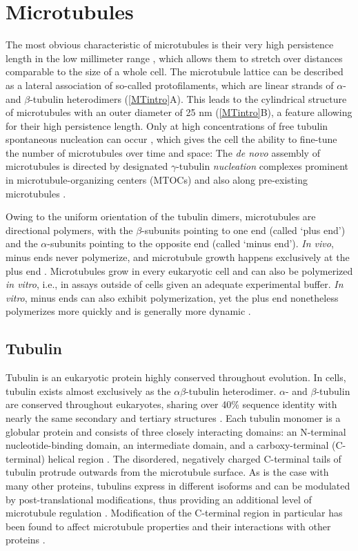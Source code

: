 \section{Microtubules}
The most obvious characteristic of microtubules is their very high persistence length in the low millimeter range \parencite{Portran2013}, which allows them to stretch over distances comparable to the size of a whole cell. The microtubule lattice can be described as a lateral association of so-called protofilaments, which are linear strands of $\alpha$- and $\beta$-tubulin heterodimers (\autoref{MTintro}A). This leads to the cylindrical structure of microtubules with an outer diameter of 25 nm (\autoref{MTintro}B), a feature allowing for their high persistence length. Only at high concentrations of free tubulin spontaneous nucleation can occur \parencite{Fygenson1994}, which gives the cell the ability to fine-tune the number of microtubules over time and space: The \textit{de novo} assembly of microtubules is directed by designated $\gamma$-tubulin \textit{nucleation} complexes prominent in microtubule-organizing centers (MTOCs) and also along pre-existing microtubules \parencite{Guttinger2009, Janson2007}. \par
Owing to the uniform orientation of the tubulin dimers, microtubules are directional polymers, with the $\beta$-subunits pointing to one end (called ‘plus end’) and the $\alpha$-subunits pointing to the opposite end (called ‘minus end’). \textit{In vivo}, minus ends never polymerize, and microtubule growth happens exclusively at the plus end \parencite{dammer}. Microtubules grow in every eukaryotic cell and can also be polymerized \textit{in vitro}, i.e., in assays outside of cells given an adequate experimental buffer. \textit{In vitro}, minus ends can also exhibit polymerization, yet the plus end nonetheless polymerizes more quickly and is generally more dynamic \parencite{Howard2003}. 

\subsection{Tubulin}
Tubulin is an eukaryotic protein highly conserved throughout evolution. In cells, tubulin exists almost exclusively as the $\alpha\beta$-tubulin heterodimer. $\alpha$- and $\beta$-tubulin are conserved throughout eukaryotes, sharing over 40\% sequence identity with nearly the same secondary and tertiary structures \parencite{DOWNING199816}. Each tubulin monomer is a globular protein and consists of three closely interacting domains: an N-terminal nucleotide-binding domain, an intermediate domain, and a carboxy-terminal (C-terminal) helical region \parencite{ALUSHIN20141117}. The disordered, negatively charged C-terminal tails of tubulin protrude outwards from the microtubule surface. As is the case with many other proteins, tubulins express in different isoforms and can be modulated by post-translational modifications, thus providing an additional level of microtubule regulation \parencite{Janke2014}. Modification of the C-terminal region in particular has been found to affect microtubule properties and their interactions with other proteins \parencite{Janke2020}. 

